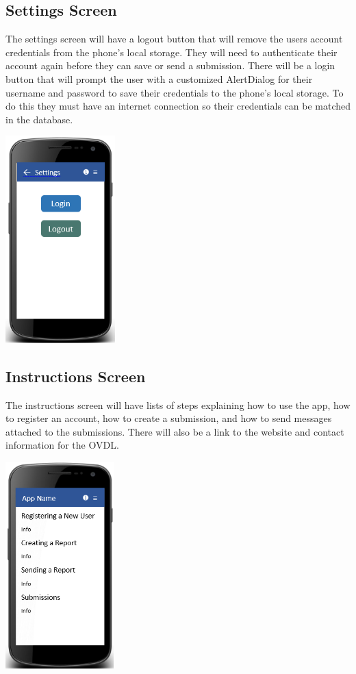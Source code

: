 \documentclass[onecolumn, draftclsnofoot,10pt, compsoc]{IEEEtran}
\begin{document}
\subsection{Settings Screen}
The settings screen will have a logout button that will remove the users account credentials from the phone’s local storage. They will need to authenticate their account again before they can save or send a submission. There will be a login button that will prompt the user with a customized AlertDialog for their username and password to save their credentials to the phone’s local storage. To do this they must have an internet connection so their credentials can be matched in the database.
\begin{center}
\includegraphics[height=8cm]{settingsscreen.png}
\end{center}

\subsection{Instructions Screen}
The instructions screen will have lists of steps explaining how to use the app, how to register an account, how to create a submission, and how to send messages attached to the submissions. There will also be a link to the website and contact information for the OVDL.
\newline
\begin{center}
\includegraphics[height=8cm]{instructionsscreen.png}
\end{center}
\end{document}

